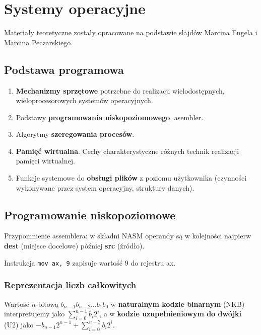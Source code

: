 \chapter{Systemy operacyjne}

Materiały teoretyczne zostały opracowane na podstawie slajdów Marcina Engela i Marcina Peczarskiego. \quad \textbf{}

\section*{Podstawa programowa}
\begin{enumerate}
    \item \textbf{Mechanizmy sprzętowe} potrzebne do realizacji wielodostępnych, wieloprocesorowych systemów operacyjnych.
    \item Podstawy \textbf{programowania niskopoziomowego}, asembler.
    \item Algorytmy \textbf{szeregowania procesów}.
    \item \textbf{Pamięć wirtualna}. Cechy charakterystyczne różnych technik realizacji pamięci wirtualnej.
    \item Funkcje systemowe do \textbf{obsługi plików} z poziomu użytkownika (czynności wykonywane przez system operacyjny, struktury danych).
\end{enumerate}

\section{Programowanie niskopoziomowe}

Przypomnienie assemblera: w składni NASM operandy są w kolejności najpierw \textbf{dest} (miejsce docelowe) później \textbf{src} (źródło).

\begin{example}
    Instrukcja \;
    \verb|mov ax, 9| \;
    zapisuje wartość 9 do rejestru ax.
\end{example}

\subsection{Reprezentacja liczb całkowitych}
Wartość $n$-bitową $b_{n - 1} b_{n - 2} \dots b_1 b_0$ w \textbf{naturalnym kodzie binarnym} (NKB) 
interpretujemy jako $\sum_{i = 0}^{n - 1} b_i 2^i$, a w \textbf{kodzie uzupełnieniowym do dwójki} (U2) jako $-b_{n-1} 2^{n - 1} + \sum_{i = 0}^{n - 2} b_i 2^i$.

